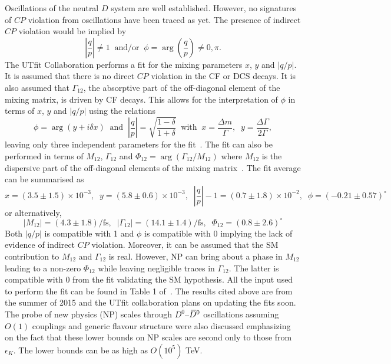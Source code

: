 \documentclass{PoS}
\newcommand{\CP}{{\ensuremath{C\!P}}\xspace}
\newcommand{\Dz}{\ensuremath{D^0}\xspace}
\def\Dbar{{\kern 0.2em\overline{\kern -0.2em\ensuremath{D}}{}}\xspace}
\newcommand{\Dzb}{\ensuremath{\Dbar{}^0}\xspace}
\newcommand{\DzDzb}{\Dz--\Dzb}
\begin{document}
Oscillations of the neutral $D$ system are well established. However, no signatures of \CP violation from oscillations have been traced as yet. The presence of indirect \CP violation would be implied by
\begin{equation}
\left|\frac{q}{p}\right| \ne 1\;\;\text{and/or}\;\;\phi=\arg\left(\frac{q}{p}\right)\ne0,\pi.
\end{equation}
The UTfit Collaboration performs a fit for the mixing parameters $x$, $y$ and $\left|q/p\right|$. It is assumed that there is no direct \CP violation in the CF or DCS decays. It is also assumed that $\Gamma_{12}$, the absorptive part of the off-diagonal element of the mixing matrix, is driven by CF decays. This allows for the interpretation of $\phi$ in terms of $x$, $y$ and $\left|q/p\right|$ using the relations
\begin{equation}
\phi=\arg(y+i\delta x)\;\;{\textrm {and}}\;\;\left|\frac{q}{p}\right|=\sqrt{\frac{1-\delta}{1+\delta}}\;\;\textrm{with}\;\; x=\frac{\Delta m}{\Gamma},\;\;y=\frac{\Delta\Gamma}{2\Gamma},
\end{equation}
leaving only three independent parameters for the fit~\cite{Ciuchini:2007cw,Kagan:2009gb}. The fit can also be performed in terms of $M_{12}$, $\Gamma_{12}$ and $\Phi_{12}=\arg(\Gamma_{12}/M_{12})$ where $M_{12}$ is the dispersive part of the off-diagonal elements of the mixing matrix~\cite{Bevan:2014tha}. The fit average can be summarised as
\begin{equation}
x=(3.5\pm1.5)\times10^{-3},\;\;y=(5.8\pm0.6)\times10^{-3},\;\;\left|\frac{q}{p}\right|-1=(0.7\pm1.8)\times10^{-2},\;\;\phi=(-0.21\pm0.57)^\circ\nonumber
\end{equation}
or alternatively,
\begin{equation}
\left|M_{12}\right|=(4.3\pm1.8)/\textrm{fs},\;\;\left|\Gamma_{12}\right|=(14.1\pm1.4)/\textrm{fs},\;\;\Phi_{12}=(0.8\pm2.6)^\circ\nonumber
\end{equation}
Both $|q/p|$ is compatible with 1 and $\phi$ is compatible with 0 implying the lack of evidence of indirect \CP violation. Moreover, it can be assumed that the SM contribution to $M_{12}$ and $\Gamma_{12}$ is real. However, NP can bring about a phase in $M_{12}$ leading to a non-zero $\Phi_{12}$ while leaving negligible traces in $\Gamma_{12}$. The latter is compatible with 0 from the fit validating the SM hypothesis. All the input used to perform the fit can be found in Table 1 of~\cite{Bevan:2014tha}. The results cited above are from the summer of 2015 and the UTfit collaboration plans on updating the fits soon. The probe of new physics (NP) scales through \DzDzb oscillations assuming $O(1)$ couplings and generic flavour structure were also discussed emphasizing on the fact that these lower bounds on NP scales are second only to those from $\epsilon_K$. The lower bounds can be as high as $O(10^5)$ TeV.
\end{document}
